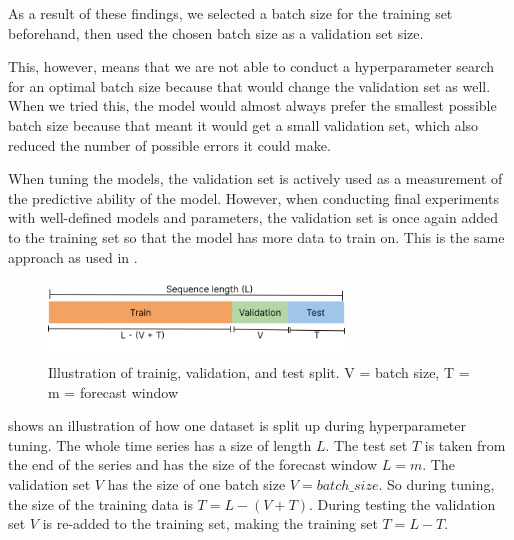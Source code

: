 As a result of these findings, we selected a batch size for the training set beforehand, then
used the chosen batch size as a validation set size.

This, however, means that we are not able to conduct a hyperparameter search for an optimal batch size
because that would change the validation set as well.
When we tried this, the model would almost always prefer the smallest possible batch size because that meant
it would get a small validation set, which also reduced the number of possible errors it could make.

When tuning the models, the validation set is actively used as a measurement of the predictive ability of the model.
However, when conducting final experiments with well-defined models and parameters,
the validation set is once again added to the training set so that the model has more data to train on.
This is the same approach as used in \cite{Hewamalage2021}.




\begin{figure}[h!]
  \centering
  \includegraphics[width=0.7\textwidth]{./figs/illustrations/illustration_train_val_test_split.png}
  \hfill
  \caption{Illustration of trainig, validation, and test split. V = batch size, T = m = forecast window}
  \label{fig:train-val-test-split}
\end{figure}

 shows an illustration of how one dataset is split up during
hyperparameter tuning.
The whole time series has a size of length $L$. The test set $T$ is taken from the end of the series
and has the size of the forecast window $L = m$. The validation set $V$ has the size of
one batch size $V=batch\_size$. So during tuning, the size of the training data is
$T = L - (V + T)$. During testing the validation set $V$ is re-added to the training set,
making the training set $T = L - T$.

